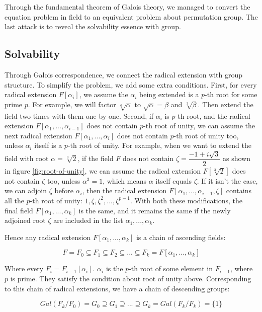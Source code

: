 \documentclass[b5paper]{article}
\begin{document}
Through the fundamental theorem of Galois theory, we managed to convert the equation problem in field to an equivalent problem about permutation group. The last attack is to reveal the solvability essence with group.

\subsection{Solvability}

Through Galois correspondence, we connect the radical extension with group structure. To simplify the problem, we add some extra conditions. First, for every radical extension $F[\alpha_i]$, we assume the $\alpha_i$ being extended is a $p$-th root for some prime $p$. For example, we will factor $\sqrt[6]{\alpha}$ to $\sqrt{\alpha} = \beta$ and $\sqrt[3]{\beta}$. Then extend the field two times with them one by one. Second, if $\alpha_i$ is $p$-th root, and the radical extension $F[\alpha_1, ..., \alpha_{i-1}]$ does not contain $p$-th root of unity, we can assume the next radical extension $F[\alpha_1, ..., \alpha_i]$ does not contain $p$-th root of unity too, unless $\alpha_i$ itself is a $p$-th root of unity. For example, when we want to extend the field with root $\alpha = \sqrt[3]{2}$, if the field $F$ does not contain $\zeta = \dfrac{-1 + i\sqrt{3}}{2}$ as shown in figure \ref{fig:root-of-unity}, we can assume the radical extension $F[\sqrt[3]{2}]$ does not contain $\zeta$ too, unless $\alpha^3 = 1$, which means $\alpha$ itself equals $\zeta$. If it isn't the case, we can adjoin $\zeta$ before $\alpha_i$, then the radical extension $F[\alpha_1, ..., \alpha_{i-1}, \zeta]$ contains all the $p$-th root of unity: $1, \zeta, \zeta^2, ..., \zeta^{p-1}$. With both these modifications, the final field $F[\alpha_1, ..., \alpha_k]$ is the same, and it remains the same if the newly adjoined root $\zeta$ are included in the list $\alpha_1, ..., \alpha_k$.

Hence any radical extension $F[\alpha_1, ..., \alpha_k]$ is a chain of ascending fields:

\[
F = F_0 \subseteq F_1 \subseteq F_2 \subseteq ... \subseteq F_k = F[\alpha_1, ..., \alpha_k]
\]

Where every $F_i = F_{i-1}[\alpha_i]$. $\alpha_i$ is the $p$-th root of some element in $F_{i-1}$, where $p$ is prime. They satisfy the condition about root of unity above. Corresponding to this chain of radical extensions, we have a chain of descending groups:

\[
Gal(F_k/F_0) = G_0 \supseteq G_1 \supseteq ... \supseteq G_k = Gal(F_k/F_k) = \{1\}
\]
\end{document}
